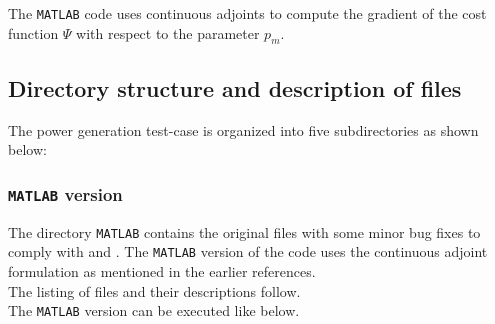 \noindent The \texttt{MATLAB} code uses continuous adjoints to compute the gradient of the cost function $\Psi$ with respect to the parameter $p_m$.
\clearpage
\subsection{Directory structure and description of files}
The power generation test-case is organized into five subdirectories as shown below:\\
\subsubsection{\texttt{MATLAB} version}
The directory \texttt{MATLAB} contains the original files with some minor bug fixes to comply with \cite{Rao_2013} and \cite{Sandu_2012}. The \texttt{MATLAB} version of the code uses the continuous adjoint formulation as mentioned in the earlier references.\\

\noindent The listing of files and their descriptions follow.\\
\hfill\break
\noindent The \texttt{MATLAB} version can be executed like below.\\

